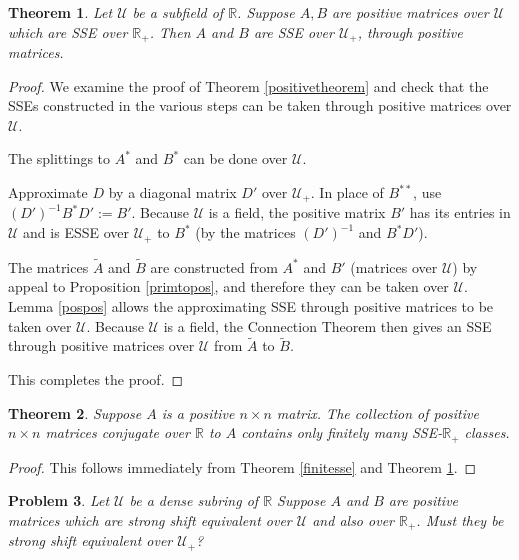 \documentclass{amsart}
\newtheorem{theorem}{Theorem}[section]
\newtheorem{problem}[theorem]{Problem}
\theoremstyle{definition}
\theoremstyle{remark}
\numberwithin{equation}{section}
\begin{document}
{{\begin{theorem} \label{field}
Let $\mathcal U$ be a subfield of $\mathbb R$.
Suppose $A,B$ are positive matrices over $\mathcal U$ 
which  are SSE over $\mathbb R_+$. Then 
$A$ and $B$ are SSE over $ \mathcal U_+$, through positive matrices. 
\end{theorem} 

\begin{proof} 
We examine the proof of Theorem \ref{positivetheorem} 
and check that the SSEs constructed in the various steps 
can be taken through positive matrices over $\mathcal U$.

The splittings to $A^*$ and  $B^*$ can be done over  $\mathcal U$.

Approximate $D$ by a diagonal matrix $D'$ over  $\mathcal U_+$.
In place of $B^{**}$, use $(D')^{-1}B^*D':=B'$. 
Because $\mathcal U$ is a field, the positive matrix $B'$ 
has its  entries  in
$\mathcal U$ and is ESSE over $\mathcal U_+$ 
to 
$B^*$ (by the matrices 
$(D')^{-1}$ and $B^*D'$). 

The matrices 
$\widetilde A$ 
and  $\widetilde B$ are constructed 
from $A^*$ and $B'$ (matrices over 
$\mathcal U$) by appeal to 
Proposition \ref{primtopos}, and therefore they can be 
taken over  $\mathcal U$. Lemma \ref{pospos} allows the 
approximating SSE through positive matrices to be taken over $\mathcal U$.
 Because $\mathcal U$ is a field, the 
Connection Theorem then 
gives an SSE through positive matrices over $\mathcal U$ 
from 
$\widetilde A$ 
to  $\widetilde B$.

This completes the proof.
\end{proof} 

\begin{theorem}\label{finitessefield}  Suppose $A$ is a positive $n\times n$ 
matrix. The collection of positive $n\times n$ matrices 
conjugate over $\mathbb R$ to $A$ contains  only finitely many 
SSE-$\mathbb R_+$ classes. 
\end{theorem} 
\begin{proof}
This follows immediately from Theorem \ref{finitesse} and Theorem \ref{field}.
\end{proof}

\begin{problem}\label{sserefinementproblem}
Let $\mathcal U$ be a dense subring of 
$\mathbb R$ Suppose  $A$ and $B$ are positive matrices which are strong shift 
equivalent over $\mathcal U$ and also over $\mathbb R_+$. 
Must they be strong shift equivalent over $\mathcal U_+$? 
\end{problem}

}}
\end{document}
